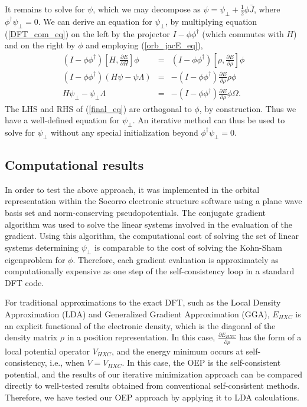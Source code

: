 \documentclass{article}
\newcommand{\bea}{\begin{eqnarray}} \newcommand{\ena}{\end{eqnarray}}
\newcommand{\half}{{\frac{1}{2}}} \newcommand{\quarter}{{\frac{1}{4}}}
\newcommand{\Vscp}{V}
\begin{document}
It remains to solve for $\psi$, which we may decompose as
$\psi = \psi_{\perp}+\half \phi \bar{J}$,
where $\phi^\dagger \psi_{\perp}=0$.
We can derive an equation for $\psi_{\perp}$,
by multiplying equation (\ref{DFT_com_eq})
on the left by the projector
$I - \phi \phi^\dagger$ (which commutes with $H$) and on the
right by $\phi$ and employing (\ref{orb_jacE_eq}),
\bea
 (I-\phi \phi^\dagger)
 \left[H,\frac{\partial E}{\partial H}\right] \phi 
  &=&
 (I-\phi \phi^\dagger)
 \left[\rho, \frac{\partial E}{\partial \rho}\right]\phi
\\
 (I-\phi \phi^\dagger)
 \left(H \psi - \psi \Lambda\right)
  &=&
 -(I - \phi \phi^\dagger) \frac{\partial E}{\partial \rho} \rho \phi
\\
\label{final_eq}
 H \psi_{\perp} - \psi_{\perp} \Lambda
  &=&
 -(I - \phi \phi^\dagger) \frac{\partial E}{\partial \rho} \phi \Omega.
\ena
The LHS and RHS of (\ref{final_eq}) are orthogonal to $\phi$,
by construction.
Thus we have a well-defined
equation for $\psi_{\perp}$.
An iterative method can thus be used to solve for $\psi_{\perp}$ without any
special initialization beyond $\phi^\dagger \psi_{\perp} = 0$.


\subsection{Computational results}

In order to test the above approach, it was implemented in the orbital representation
within the Socorro electronic
structure software using a plane wave basis set and norm-conserving pseudopotentials.
The conjugate gradient algorithm was used to solve the linear systems involved in the
evaluation of the gradient.  Using this algorithm, the computational cost of solving
the set of linear systems determining $\psi_{\perp}$ is comparable to the cost of
solving the Kohn-Sham eigenproblem for $\phi$.  Therefore, each gradient evaluation
is approximately as computationally expensive as one step of the self-consistency
loop in a standard DFT code.

For traditional approximations to the exact DFT,
such as the Local Density Approximation (LDA) and Generalized Gradient Approximation (GGA),
$E_{HXC}$ is an explicit functional of the electronic density, which is the diagonal of
the density matrix $\rho$ in a position representation.  In this case,
$\frac{\partial E_{HXC}}{\partial \rho}$ has the form of a local potential operator $V_{HXC}$,
and the energy minimum occurs at self-consistency, i.e., when $\Vscp = V_{HXC}$.
In this case, the OEP is the self-consistent potential, and the results of our iterative
minimization approach can be compared directly to well-tested results obtained from
conventional self-consistent methods.  Therefore, we have tested our OEP approach by applying
it to LDA calculations.
\end{document}

